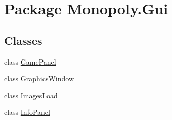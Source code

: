 \hypertarget{namespace_monopoly_1_1_gui}{}\section{Package Monopoly.\+Gui}
\label{namespace_monopoly_1_1_gui}
\subsection*{Classes}
\begin{DoxyCompactItemize}
\item 
class \hyperlink{class_monopoly_1_1_gui_1_1_game_panel}{Game\+Panel}
\item 
class \hyperlink{class_monopoly_1_1_gui_1_1_graphics_window}{Graphics\+Window}
\item 
class \hyperlink{class_monopoly_1_1_gui_1_1_images_load}{Images\+Load}
\item 
class \hyperlink{class_monopoly_1_1_gui_1_1_info_panel}{Info\+Panel}
\end{DoxyCompactItemize}
